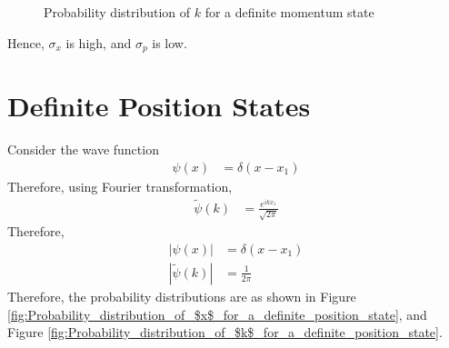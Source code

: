 \documentclass[titlepage, fleqn, a4paper, 12pt, twoside]{article}
\theoremstyle{definition}
\theoremstyle{theorem}
\let\Oldsection\section
\renewcommand{\section}{\FloatBarrier\Oldsection}
\renewcommand{\tilde}{\widetilde}
\begin{document}
\begin{figure}[h]
	\centering
	\caption{Probability distribution of $k$ for a definite momentum state}
	\label{fig:Probability_distribution_of_$k$_for_a_definite_momentum_state}
\end{figure}

Hence, $\sigma_x$ is high, and $\sigma_p$ is low.

\section{Definite Position States}

Consider the wave function
\begin{align*}
	\psi(x) &= \delta(x - x_1)
\end{align*}
Therefore, using Fourier transformation,
\begin{align*}
	\tilde{\psi}(k) &= \frac{e^{i k x_1}}{\sqrt{2 \pi}}
\end{align*}
Therefore,
\begin{align*}
	\left| \psi(x) \right| &= \delta(x - x_1)\\
	\left| \tilde{\psi}(k) \right| &= \frac{1}{2 \pi}
\end{align*}
Therefore, the probability distributions are as shown in Figure \ref{fig:Probability_distribution_of_$x$_for_a_definite_position_state}, and Figure \ref{fig:Probability_distribution_of_$k$_for_a_definite_position_state}.
\end{document}
